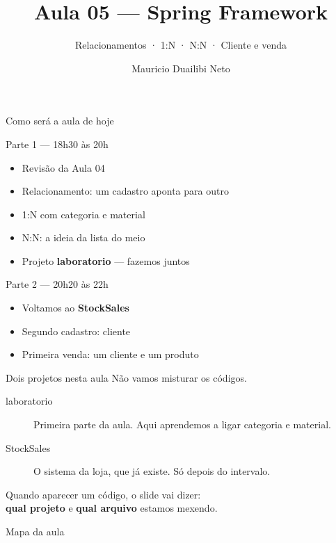 \documentclass[aspectratio=169,11pt]{beamer}
\title{Aula 05 --- Spring Framework}
\subtitle{Relacionamentos · 1{:}N · N{:}N · Cliente e venda}
\author{Mauricio Duailibi Neto}
\institute{Turma Java Entra21}
\date{}
\begin{document}
\begin{frame}
  \titlepage
\end{frame}

\begin{frame}{Como será a aula de hoje}
  \begin{block}{Parte 1 --- 18h30 às 20h}
    \begin{itemize}
      \item Revisão da Aula 04
      \item Relacionamento: um cadastro aponta para outro
      \item 1{:}N com categoria e material
      \item N{:}N: a ideia da lista do meio
      \item Projeto \textbf{laboratorio} --- fazemos juntos
    \end{itemize}
  \end{block}

  \vspace{0.4em}
  \begin{block}{Parte 2 --- 20h20 às 22h}
    \begin{itemize}
      \item Voltamos ao \textbf{StockSales}
      \item Segundo cadastro: cliente
      \item Primeira venda: um cliente e um produto
    \end{itemize}
  \end{block}
\end{frame}

\begin{frame}{Dois projetos nesta aula}
  Não vamos misturar os códigos.

  \vspace{0.6em}
  \begin{description}
    \item[laboratorio] Primeira parte da aula.
      Aqui aprendemos a ligar categoria e material.
    \item[StockSales] O sistema da loja, que já existe.
      Só depois do intervalo.
  \end{description}

  \vspace{0.6em}
  Quando aparecer um código, o slide vai dizer:\\
  \textbf{qual projeto} e \textbf{qual arquivo} estamos mexendo.
\end{frame}

\begin{frame}{Mapa da aula}
  \tableofcontents
\end{frame}
\end{document}
